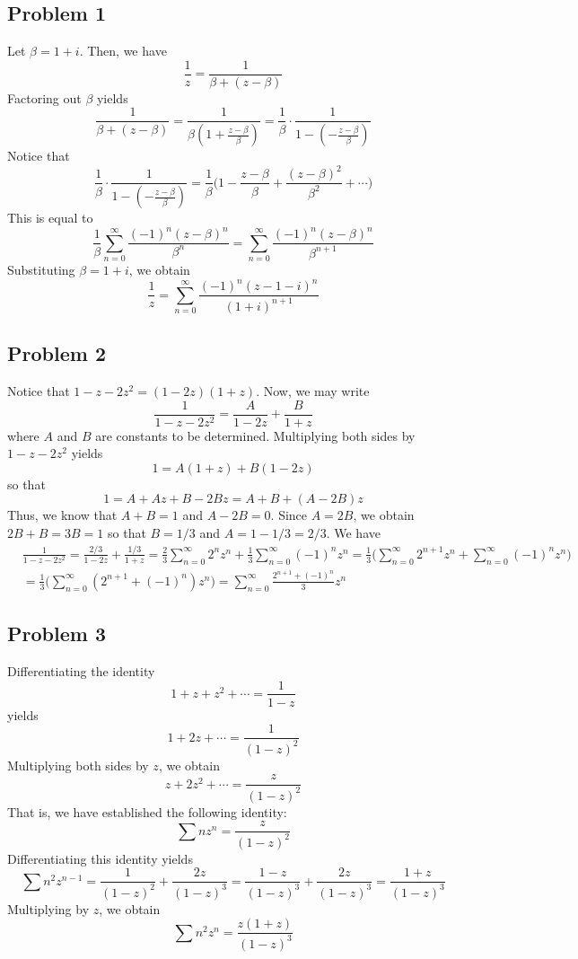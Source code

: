 \documentclass[12pt]{article}
\begin{document}
\subsection*{Problem 1}
Let $\beta = 1+i$. Then, we have
\[
\frac{1}{z} = \frac{1}{\beta+(z-\beta)}
\] Factoring out $\beta$ yields
\[
\frac{1}{\beta+(z-\beta)} = \frac{1}{\beta(1+\frac{z-\beta}{\beta})} = \frac{1}{\beta} \cdot \frac{1}{1 - (-\frac{z-\beta}{\beta})}
\] Notice that
\[
\frac{1}{\beta} \cdot \frac{1}{1 - (-\frac{z-\beta}{\beta})} = \frac{1}{\beta} \bigg(1 - \frac{z - \beta}{\beta} + \frac{(z - \beta)^2}{
\beta^2} + \cdots \bigg)
\] This is equal to
\[
\frac{1}{\beta} \sum_{n=0}^\infty \frac{(-1)^n (z-\beta)^n}{\beta^n} = \sum_{n=0}^\infty \frac{(-1)^n (z-\beta)^n}{\beta^{n+1}}
\] Substituting $\beta = 1+i$, we obtain
\[
\frac{1}{z} = \sum_{n=0}^\infty \frac{(-1)^n (z-1-i)^n}{(1+i)^{n+1}}
\]
\newpage
\subsection*{Problem 2}
Notice that $1-z-2z^2 = (1-2z)(1+z)$. Now, we may write
\[
\frac{1}{1-z-2z^2} = \frac{A}{1-2z} + \frac{B}{1+z}
\] where $A$ and $B$ are constants to be determined. Multiplying both sides by $1-z-2z^2$ yields
\[
1 = A(1+z) + B(1-2z) 
\] so that
\[
1 = A + Az + B - 2Bz = A+B + (A-2B)z
\] Thus, we know that $A+B = 1$ and $A-2B = 0$. Since $A = 2B$, we obtain $2B + B = 3B =1$ so that $B = 1/3$ and $A = 1 - 1/3 = 2/3$. We have
\begin{align*}
&\frac{1}{1-z-2z^2} = \frac{2/3}{1-2z} + \frac{1/3}{1+z} = \frac{2}{3}\sum_{n=0}^\infty 2^n z^n + \frac{1}{3}\sum_{n=0}^\infty (-1)^n z^n = \frac{1}{3}\bigg(\sum_{n=0}^\infty 2^{n+1} z^n + \sum_{n=0}^\infty  (-1)^n z^n \bigg)\\
& = \frac{1}{3}\bigg(\sum_{n=0}^\infty (2^{n+1}+(-1)^n)z^n\bigg) = \sum_{n=0}^\infty \frac{2^{n+1}+(-1)^n}{3}z^n
\end{align*}
\newpage
\subsection*{Problem 3}
Differentiating the identity
\[
1+z+z^2+\cdots = \frac{1}{1-z}
\] yields
\[
1 + 2z + \cdots = \frac{1}{(1-z)^2}
\] Multiplying both sides by $z$, we obtain
\[
z + 2z^2 + \cdots = \frac{z}{(1-z)^2}
\] That is, we have established the following identity:
\[
\sum nz^n = \frac{z}{(1-z)^2}
\] Differentiating this identity yields
\[
\sum n^2 z^{n-1} = \frac{1}{(1-z)^2} + \frac{2z}{(1-z)^3} = \frac{1-z}{(1-z)^3} + \frac{2z}{(1-z)^3} =\frac{1+ z}{(1-z)^3}
\] Multiplying by $z$, we obtain
\[
\sum n^2 z^n  = \frac{z(1+z)}{(1-z)^3}
\]
\newpage
\end{document}
